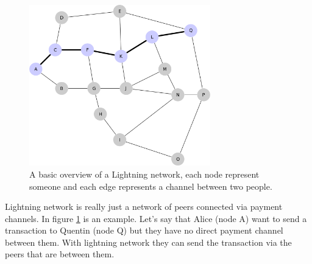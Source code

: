 \begin{figure}[H]
	\centering
	\includegraphics[width=0.70\textwidth]{introduction/images/mesh_network.png}
	\caption{A basic overview of a Lightning network, each node represent someone
	and each edge represents a channel between two people.}
	\label{fig:mesh}
\end{figure}

Lightning network is really just a network of peers connected via payment channels. In figure \ref{fig:mesh} is an example. Let's say that Alice (node A) want to send a transaction to Quentin (node Q) but they have no direct payment channel between them. With lightning network they can send the transaction via the peers that are between them. 